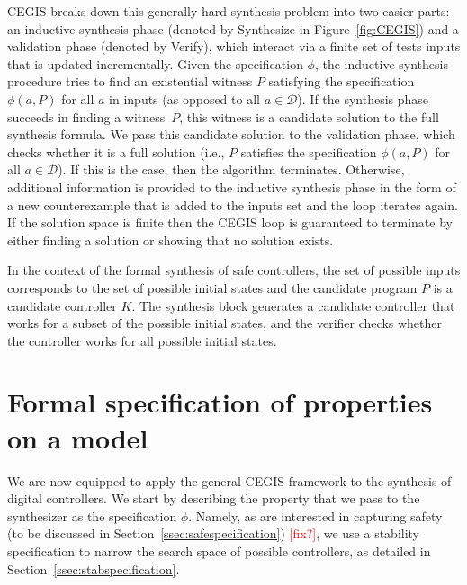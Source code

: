 \documentclass[twocolumn]{autart}    %
\renewcommand{\note}[1]{\textcolor{red}{[#1]}}
\begin{document}
CEGIS breaks down this generally hard synthesis problem into two easier parts:
an inductive synthesis phase (denoted by {\sc Synthesize} in
Figure~\ref{fig:CEGIS}) and a validation phase (denoted by {\sc
  Verify}), which interact via a finite set of tests {\sc
  inputs} that is updated incrementally.
Given the specification $\phi$, the inductive synthesis procedure tries to
find an existential witness $P$ satisfying the specification
$\phi(a, P)$ for all $a$ in {\sc inputs} (as opposed to all $a \in
\mathcal{D}$).
%
If the synthesis phase succeeds in finding a witness~$P$, this witness is a
candidate solution to the full synthesis formula.  We pass this candidate
solution to the validation phase, which checks whether it is a full solution
(i.e., $P$ satisfies the specification $\phi(a, P)$ for all
$a\in\mathcal{D}$).  If this is the case, then the algorithm terminates. 
Otherwise, additional information is provided to the inductive synthesis
phase in the form of a new counterexample that is added to the {\sc inputs}
set and the loop iterates again.  %
If the solution space is finite then the CEGIS loop is guaranteed to
terminate by either finding a solution or showing that no solution
exists.

In the context of the formal synthesis of safe controllers, 
the set of possible {\sc inputs} corresponds to the set of possible initial states and the 
candidate program $P$ is a candidate controller $K$. The synthesis block generates a candidate
controller that works for a subset of the possible initial states, and the verifier checks whether 
the controller works for all possible initial states. 

\section{Formal specification of properties on a model} 
\label{sec:specification}

We are now equipped to apply the general CEGIS framework to the synthesis of digital controllers. 
We start by describing the property that we pass to the synthesizer as the specification $\phi$. 
Namely, as are interested in capturing safety (to be discussed in Section~\ref{ssec:safespecification}) \note{fix?},  
we use a stability specification to narrow the search space of possible controllers, as detailed in Section~\ref{ssec:stabspecification}.
\end{document}
